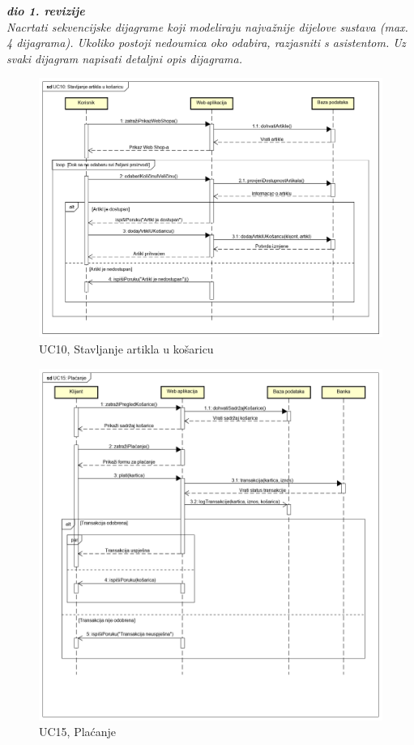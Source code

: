 				\textbf{\textit{dio 1. revizije}}\\
				
				\textit{Nacrtati sekvencijske dijagrame koji modeliraju najvažnije dijelove sustava (max. 4 dijagrama). Ukoliko postoji nedoumica oko odabira, razjasniti s asistentom. Uz svaki dijagram napisati detaljni opis dijagrama.}
				\eject
				
				\begin{figure}[H]
					\includegraphics[width=\linewidth]{dijagrami/UC10.png}
					\centering
					\caption{UC10, Stavljanje artikla u košaricu}
					\label{fig:SequanceDiagram1}
				\end{figure}
			
				\begin{figure}[H]
					\includegraphics[width=\linewidth]{dijagrami/UC15.png}
					\centering
					\caption{UC15, Plaćanje}
					\label{fig:SequanceDiagram2}
				\end{figure}
			
